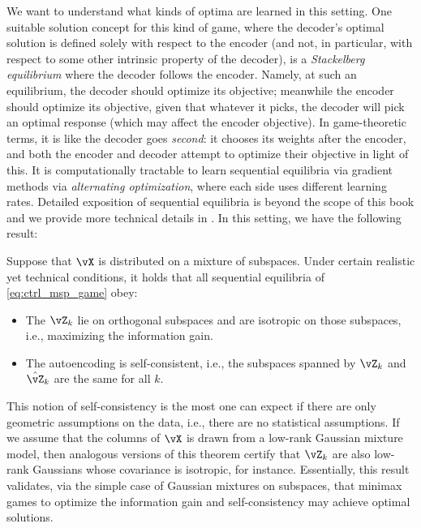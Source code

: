\documentclass[../../book-main.tex]{subfiles}
\begin{document}
We want to understand what kinds of optima are learned in this setting. One suitable solution concept for this kind of game, where the decoder's optimal solution is defined solely with respect to the encoder (and not, in particular, with respect to some other intrinsic property of the decoder), is a \textit{Stackelberg equilibrium} where the decoder follows the encoder. %
Namely, at such an equilibrium, the decoder should optimize its objective; meanwhile the encoder should optimize its objective, given that whatever it picks, the decoder will pick an optimal response (which may affect the encoder objective). In game-theoretic terms, it is like the decoder goes \textit{second}: it chooses its weights after the encoder, and both the encoder and decoder attempt to optimize their objective in light of this. It is computationally tractable to learn sequential equilibria via gradient methods via \textit{alternating optimization}, where each side uses different learning rates. Detailed exposition of sequential equilibria is beyond the scope of this book and we provide more technical details in . In this setting, we have the following result:
\begin{theorem}\label{thm:ctrl_theory}
    Suppose that \(\vX\) is distributed on a mixture of subspaces. Under certain realistic yet technical conditions, it holds that all sequential equilibria of \eqref{eq:ctrl_msp_game} obey:
    \begin{itemize}
        \item The \(\vZ_{k}\) lie on orthogonal subspaces and are isotropic on those subspaces, i.e., maximizing the information gain.
        \item The autoencoding is self-consistent, i.e., the subspaces spanned by \(\vZ_{k}\) and \(\hat{\vZ}_{k}\) are the same for all \(k\).
    \end{itemize}
\end{theorem}
This notion of self-consistency is the most one can expect if there are only geometric assumptions on the data, i.e., there are no statistical assumptions. If we assume that the columns of \(\vX\) is drawn from a low-rank Gaussian mixture model, then analogous versions of this theorem certify that \(\vZ_{k}\) are also low-rank Gaussians whose covariance is isotropic, for instance. %
Essentially, this result validates, via the simple case of Gaussian mixtures on subspaces, that minimax games to optimize the information gain and self-consistency may achieve optimal solutions.
\end{document}
